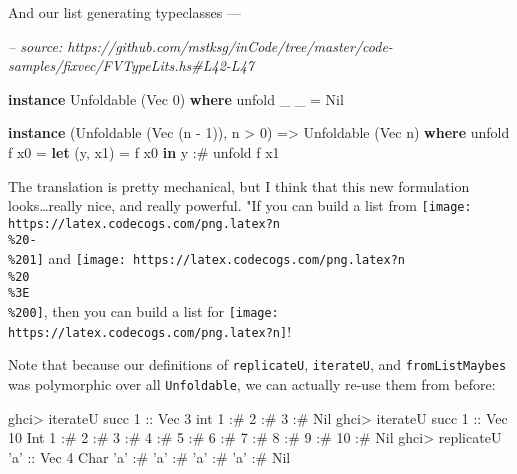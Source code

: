 \documentclass[]{article}
\newenvironment{Shaded}{}{}
\newcommand{\CharTok}[1]{\textcolor[rgb]{0.25,0.44,0.63}{#1}}
\newcommand{\CommentTok}[1]{\textcolor[rgb]{0.38,0.63,0.69}{\textit{#1}}}
\newcommand{\DataTypeTok}[1]{\textcolor[rgb]{0.56,0.13,0.00}{#1}}
\newcommand{\DecValTok}[1]{\textcolor[rgb]{0.25,0.63,0.44}{#1}}
\newcommand{\FunctionTok}[1]{\textcolor[rgb]{0.02,0.16,0.49}{#1}}
\newcommand{\KeywordTok}[1]{\textcolor[rgb]{0.00,0.44,0.13}{\textbf{#1}}}
\newcommand{\NormalTok}[1]{#1}
\newcommand{\OtherTok}[1]{\textcolor[rgb]{0.00,0.44,0.13}{#1}}
\begin{document}
And our list generating typeclasses ---

\begin{Shaded}
\begin{Highlighting}[]
\CommentTok{-- source: https://github.com/mstksg/inCode/tree/master/code-samples/fixvec/FVTypeLits.hs#L42-L47}

\KeywordTok{instance} \DataTypeTok{Unfoldable}\NormalTok{ (}\DataTypeTok{Vec} \DecValTok{0}\NormalTok{) }\KeywordTok{where}
\NormalTok{    unfold _ _ }\FunctionTok{=} \DataTypeTok{Nil}

\KeywordTok{instance}\NormalTok{ (}\DataTypeTok{Unfoldable}\NormalTok{ (}\DataTypeTok{Vec}\NormalTok{ (n }\FunctionTok{-} \DecValTok{1}\NormalTok{)), n }\FunctionTok{>} \DecValTok{0}\NormalTok{) }\OtherTok{=>} \DataTypeTok{Unfoldable}\NormalTok{ (}\DataTypeTok{Vec}\NormalTok{ n) }\KeywordTok{where}
\NormalTok{    unfold f x0 }\FunctionTok{=} \KeywordTok{let}\NormalTok{ (y, x1) }\FunctionTok{=}\NormalTok{ f x0}
                  \KeywordTok{in}\NormalTok{  y }\FunctionTok{:#}\NormalTok{ unfold f x1}
\end{Highlighting}
\end{Shaded}

The translation is pretty mechanical, but I think that this new formulation
looks\ldots{}really nice, and really powerful. "If you can build a list from
\texttt{[image: https://latex.codecogs.com/png.latex?n\\\%20-\\\%201]} and
\texttt{[image: https://latex.codecogs.com/png.latex?n\\\%20\\\%3E\\\%200]}, then you
can build a list for \texttt{[image: https://latex.codecogs.com/png.latex?n]}!

Note that because our definitions of \texttt{replicateU}, \texttt{iterateU}, and
\texttt{fromListMaybes} was polymorphic over all \texttt{Unfoldable}, we can
actually re-use them from before:

\begin{Shaded}
\begin{Highlighting}[]
\NormalTok{ghci}\FunctionTok{>}\NormalTok{ iterateU succ }\DecValTok{1}\OtherTok{ ::} \DataTypeTok{Vec} \DecValTok{3}\NormalTok{ int}
\DecValTok{1} \FunctionTok{:#} \DecValTok{2} \FunctionTok{:#} \DecValTok{3} \FunctionTok{:#} \DataTypeTok{Nil}
\NormalTok{ghci}\FunctionTok{>}\NormalTok{ iterateU succ }\DecValTok{1}\OtherTok{ ::} \DataTypeTok{Vec} \DecValTok{10} \DataTypeTok{Int}
\DecValTok{1} \FunctionTok{:#} \DecValTok{2} \FunctionTok{:#} \DecValTok{3} \FunctionTok{:#} \DecValTok{4} \FunctionTok{:#} \DecValTok{5} \FunctionTok{:#} \DecValTok{6} \FunctionTok{:#} \DecValTok{7} \FunctionTok{:#} \DecValTok{8} \FunctionTok{:#} \DecValTok{9} \FunctionTok{:#} \DecValTok{10} \FunctionTok{:#} \DataTypeTok{Nil}
\NormalTok{ghci}\FunctionTok{>}\NormalTok{ replicateU }\CharTok{'a'}\OtherTok{ ::} \DataTypeTok{Vec} \DecValTok{4} \DataTypeTok{Char}
\CharTok{'a'} \FunctionTok{:#} \CharTok{'a'} \FunctionTok{:#} \CharTok{'a'} \FunctionTok{:#} \CharTok{'a'} \FunctionTok{:#} \DataTypeTok{Nil}
\end{Highlighting}
\end{Shaded}
\end{document}
